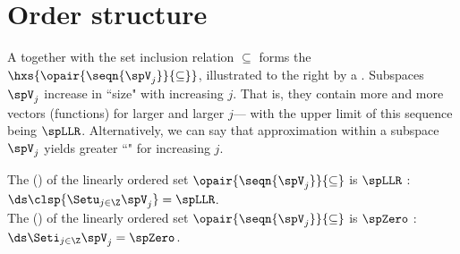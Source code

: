 \section{Order structure}

\begin{minipage}{\tw-58mm}%
  A   together with the set inclusion relation $\subseteq$
  forms the  
  $\hxs{\opair{\seqn{\spV_j}}{\subseteq}}$, illustrated to the right by a .
  Subspaces $\spV_j$ increase in ``size" with increasing $j$.
  That is, they contain more and more vectors (functions) for larger and larger $j$---%
  with the upper limit of this sequence being $\spLLR$.
  Alternatively, we can say that approximation within a subspace $\spV_j$ 
  yields greater ``" for increasing $j$.
\end{minipage}%
\hfill{}%

The  () of the linearly ordered set $\opair{\seqn{\spV_j}}{\subseteq}$ is $\spLLR$ :
  \\\indentx
   $\ds\clsp{\Setu_{j\in\Z} \spV_j} = \spLLR$.
  \\


The  () of the linearly ordered set $\opair{\seqn{\spV_j}}{\subseteq}$ is $\spZero$ :
  \\\indentx
    $\ds\Seti_{j\in\Z}\spV_j = \spZero$.
  \\

